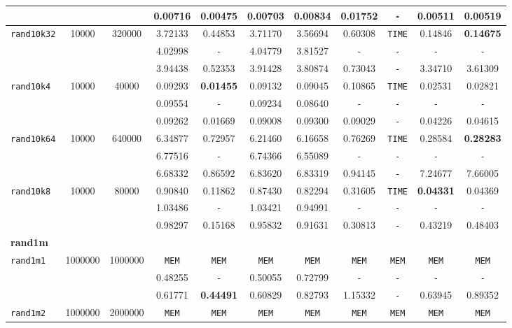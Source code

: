 {\begin{tabular}{ l c c | c c c c c c c c }
 &  &  & 0.00716 & 0.00475 & 0.00703 & 0.00834 & 0.01752 & \verb|-| & 0.00511 & 0.00519 \\
\hline
\verb|rand10k32| & 10000 & 320000 & 3.72133 & 0.44853 & 3.71170 & 3.56694 & 0.60308 & \verb|TIME| & 0.14846 & \textbf{0.14675} \\
 &  &  & 4.02998 & \verb|-| & 4.04779 & 3.81527 & \verb|-| & \verb|-| & \verb|-| & \verb|-| \\
 &  &  & 3.94438 & 0.52353 & 3.91428 & 3.80874 & 0.73043 & \verb|-| & 3.34710 & 3.61309 \\
\hline
\verb|rand10k4| & 10000 & 40000 & 0.09293 & \textbf{0.01455} & 0.09132 & 0.09045 & 0.10865 & \verb|TIME| & 0.02531 & 0.02821 \\
 &  &  & 0.09554 & \verb|-| & 0.09234 & 0.08640 & \verb|-| & \verb|-| & \verb|-| & \verb|-| \\
 &  &  & 0.09262 & 0.01669 & 0.09008 & 0.09300 & 0.09029 & \verb|-| & 0.04226 & 0.04615 \\
\hline
\verb|rand10k64| & 10000 & 640000 & 6.34877 & 0.72957 & 6.21460 & 6.16658 & 0.76269 & \verb|TIME| & 0.28584 & \textbf{0.28283} \\
 &  &  & 6.77516 & \verb|-| & 6.74366 & 6.55089 & \verb|-| & \verb|-| & \verb|-| & \verb|-| \\
 &  &  & 6.68332 & 0.86592 & 6.83620 & 6.83319 & 0.94145 & \verb|-| & 7.24677 & 7.66005 \\
\hline
\verb|rand10k8| & 10000 & 80000 & 0.90840 & 0.11862 & 0.87430 & 0.82294 & 0.31605 & \verb|TIME| & \textbf{0.04331} & 0.04369 \\
 &  &  & 1.03486 & \verb|-| & 1.03421 & 0.94991 & \verb|-| & \verb|-| & \verb|-| & \verb|-| \\
 &  &  & 0.98297 & 0.15168 & 0.95832 & 0.91631 & 0.30813 & \verb|-| & 0.43219 & 0.48403 \\
\hline
\multicolumn{11}{l}{\textbf{rand1m}} \\
\hline
\verb|rand1m1| & 1000000 & 1000000 & \verb|MEM| & \verb|MEM| & \verb|MEM| & \verb|MEM| & \verb|MEM| & \verb|MEM| & \verb|MEM| & \verb|MEM| \\
 &  &  & 0.48255 & \verb|-| & 0.50055 & 0.72799 & \verb|-| & \verb|-| & \verb|-| & \verb|-| \\
 &  &  & 0.61771 & \textbf{0.44491} & 0.60829 & 0.82793 & 1.15332 & \verb|-| & 0.63945 & 0.89352 \\
\hline
\verb|rand1m2| & 1000000 & 2000000 & \verb|MEM| & \verb|MEM| & \verb|MEM| & \verb|MEM| & \verb|MEM| & \verb|MEM| & \verb|MEM| & \verb|MEM| \\

\end{tabular}}
